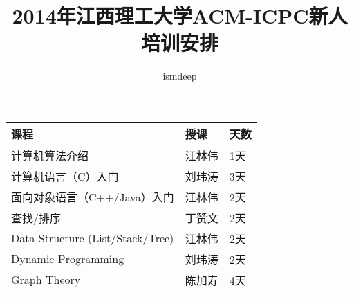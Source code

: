 \documentclass[12pt,a4paper,landscape]{article}
\begin{document}
\begin{CJK}{UTF8}{gbsn}
\title{2014年江西理工大学ACM-ICPC新人培训安排}
\author{ismdeep}
\date{}


\maketitle


\begin{flushleft}

\begin{LARGE}

\begin{tabular}{|l|l|l|}\hline
课程 & 授课 & 天数 \\ \hline

计算机算法介绍                    &  江林伟  & 1天 \\ \hline

计算机语言（C）入门                 & 刘玮涛   & 3天 \\ \hline

面向对象语言（C++/Java）入门        & 江林伟 & 2天 \\ \hline

查找/排序                         & 丁赞文   & 2天 \\ \hline

Data Structure (List/Stack/Tree) & 江林伟 & 2天 \\ \hline

Dynamic Programming              & 刘玮涛   & 2天 \\ \hline

Graph Theory                     & 陈加寿  & 4天 \\ \hline




\end{tabular}


\end{LARGE}

\end{flushleft}

\end{CJK}
\end{document}
